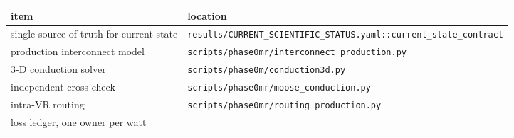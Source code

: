 \documentclass[10pt,]{article}
\begin{document}
\begin{longtable}[]{@{}ll@{}}
\toprule
\begin{minipage}[b]{0.47\columnwidth}\raggedright
item\strut
\end{minipage} & \begin{minipage}[b]{0.47\columnwidth}\raggedright
location\strut
\end{minipage}\tabularnewline
\midrule
\endhead
\begin{minipage}[t]{0.47\columnwidth}\raggedright
single source of truth for current state\strut
\end{minipage} & \begin{minipage}[t]{0.47\columnwidth}\raggedright
\texttt{results/CURRENT\_SCIENTIFIC\_STATUS.yaml::current\_state\_contract}\strut
\end{minipage}\tabularnewline
\begin{minipage}[t]{0.47\columnwidth}\raggedright
production interconnect model\strut
\end{minipage} & \begin{minipage}[t]{0.47\columnwidth}\raggedright
\texttt{scripts/phase0mr/interconnect\_production.py}\strut
\end{minipage}\tabularnewline
\begin{minipage}[t]{0.47\columnwidth}\raggedright
3-D conduction solver\strut
\end{minipage} & \begin{minipage}[t]{0.47\columnwidth}\raggedright
\texttt{scripts/phase0m/conduction3d.py}\strut
\end{minipage}\tabularnewline
\begin{minipage}[t]{0.47\columnwidth}\raggedright
independent cross-check\strut
\end{minipage} & \begin{minipage}[t]{0.47\columnwidth}\raggedright
\texttt{scripts/phase0mr/moose\_conduction.py}\strut
\end{minipage}\tabularnewline
\begin{minipage}[t]{0.47\columnwidth}\raggedright
intra-VR routing\strut
\end{minipage} & \begin{minipage}[t]{0.47\columnwidth}\raggedright
\texttt{scripts/phase0mr/routing\_production.py}\strut
\end{minipage}\tabularnewline
\begin{minipage}[t]{0.47\columnwidth}\raggedright
loss ledger, one owner per watt\strut
\end{minipage} & \begin{minipage}[t]{0.47\columnwidth}\raggedright

\end{minipage}
\end{longtable}
\end{document}
